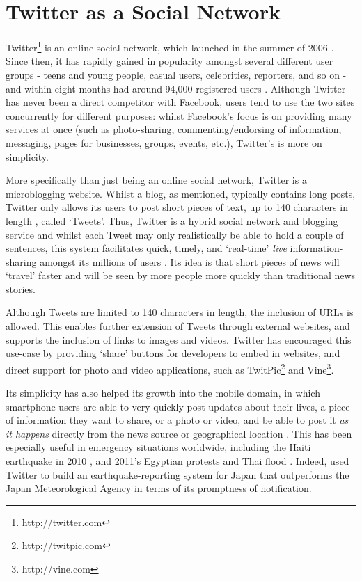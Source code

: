 \section{Twitter as a Social Network}
Twitter\footnote{http://twitter.com} is an online social network, which launched in the summer of 2006 \cite{krishnamurthy08}. Since then, it has rapidly gained in popularity amongst several different user groups - teens and young people, casual users, celebrities, reporters, and so on - and within eight months had around 94,000 registered users \cite{java07}. Although Twitter has never been a direct competitor with Facebook, users tend to use the two sites concurrently for different purposes: whilst Facebook's focus is on providing many services at once (such as photo-sharing, commenting/endorsing of information, messaging, pages for businesses, groups, events, etc.), Twitter's is more on simplicity.

More specifically than just being an online social network, Twitter is a microblogging website. Whilst a blog, as mentioned, typically contains long posts, Twitter only allows its users to post short pieces of text, up to 140 characters in length \cite{krishnamurthy08} \cite{huberman08}, called `Tweets'. Thus, Twitter is a hybrid social network and blogging service and whilst each Tweet may only realistically be able to hold a couple of sentences, this system facilitates quick, timely, and `real-time' \textit{live} information-sharing amongst its millions of users \cite{zhao09}. Its idea is that short pieces of news will `travel' faster and will be seen by more people more quickly than traditional news stories.

Although Tweets are limited to 140 characters in length, the inclusion of URLs is allowed. This enables further extension of Tweets through external websites, and supports the inclusion of links to images and videos. Twitter has encouraged this use-case by providing `share' buttons for developers to embed in websites, and direct support for photo and video applications, such as TwitPic\footnote{http://twitpic.com} and Vine\footnote{http://vine.com}.

Its simplicity has also helped its growth into the mobile domain, in which smartphone users are able to very quickly post updates about their lives, a piece of information they want to share, or a photo or video, and be able to post it \textit{as it happens} directly from the news source or geographical location \cite{castillo11}. This has been especially useful in emergency situations worldwide, including the Haiti earthquake in 2010 \cite{muralidharan11}, and 2011's Egyptian protests \cite{wilson11} and Thai flood \cite{kongthon12}. Indeed, \cite{sakaki10} used Twitter to build an earthquake-reporting system for Japan that outperforms the Japan Meteorological Agency in terms of its promptness of notification.

